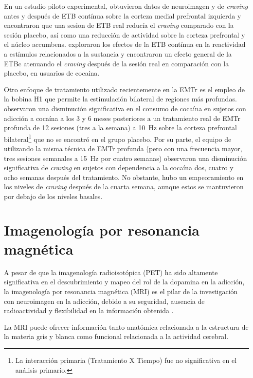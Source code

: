 En un estudio piloto experimental, \textcite{Hanlon2015} obtuvieron datos de neuroimagen y de \textit{craving} antes y después de ETB contínua sobre la corteza medial prefrontal izquierda y encontraron que una sesion de ETB real reducía el \textit{craving} comparado con la sesión placebo, así como una reducción de actividad sobre la corteza prefrontal y el núcleo accumbens.
\textcite{Kearney-Ramos2018a} exploraron los efectos de la ETB contínua en la reactividad a estímulos relacionados a la sustancia y encontraron un efecto general de la ETBc atenuando el \textit{craving} después de la sesión real en comparación con la placebo, en usuarios de cocaína. \par
Otro enfoque de tratamiento utilizado recientemente en la EMTr es el empleo de la bobina H1 que permite la estimulación bilateral de regiones más profundas.
\textcite{Bolloni2016} observaron una disminución significativa en el consumo de cocaína en sujetos con adicción a cocaína a los 3 y 6 meses posteriores a un tratamiento real de EMTr profunda de 12 sesiones (tres a la semana) a \SI{10}{\hertz} sobre la corteza prefrontal bilateral\footnote{La interacción primaria (Tratamiento X Tiempo) fue no significativa en el análisis primario.} que no se encontró en el grupo placebo.
Por su parte, el equipo de \textcite{Rapinesi2016} utilizando la misma técnica de EMTr profunda (pero con una frecuencia mayor, tres sesiones semanales a \SI{15}{\hertz} por cuatro semanas) observaron una disminución significativa de \textit{craving} en sujetos con dependencia a la cocaína dos, cuatro y ocho semanas después del tratamiento.
No obstante, hubo un empeoramiento en los niveles de \textit{craving} después de la cuarta semana, aunque estos se mantuvieron por debajo de los niveles basales.

\section{Imagenología por resonancia magnética}
A pesar de que la imagenología radioisotópica (PET) ha sido altamente significativa en el descubrimiento y mapeo del rol de la dopamina en la adicción, la imagenología por resonancia magnética (MRI) es el pilar de la investigación con neuroimagen en la adicción, debido a su seguridad, ausencia de radioactividad y flexibilidad en la información obtenida \parencite{Suckling2017}. \par
La MRI puede ofrecer información tanto anatómica \textemdash{}relacionada a la estructura de la materia gris y blanca\textemdash{} como funcional \textemdash{}relacionada a la actividad cerebral.

